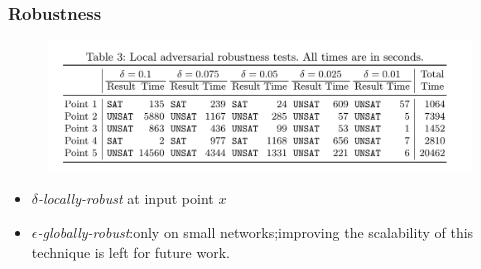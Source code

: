 \documentclass[aspectratio=169%
,serif,mathserif]{beamer}
\begin{document}
\begin{frame}
	\frametitle{Robustness}
	\begin{figure}
		\includegraphics[width=0.75\linewidth]{16.png}
	\end{figure}

	\begin{itemize}
		\item \emph{$\delta$-locally-robust} at input point $x$ 
		\item \emph{$\epsilon$-globally-robust}:only on small networks;improving the
		scalability of this technique is left for future work.
	\end{itemize}
\end{frame}





\begin{frame}
\hfill
{}
\linespread{3}\selectfont
\end{frame}
\end{document}

